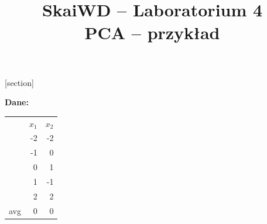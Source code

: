 \documentclass[a4paper,11pt]{article}
\newcommand{\myHeaderCellColor}{\cellcolor{black!10}}
\newcommand{\myEmptySpace}{\hspace{0.8cm}}
\begin{document}
\title{{\large SkaiWD -- Laboratorium 4}\\\textbf{PCA -- przykład}}
\date{}
\maketitle
\vspace{-1cm}

\def \myZadanieOdstep {1cm}
[section]
\newcommand{\theMyTaskNumber}{\stepcounter{myTaskNumber}\arabic{myTaskNumber}}
\newcommand{\theMySectNumber}{\arabic{section}}


\noindent\begin{minipage}[t]{0.3\textwidth}
\noindent\textbf{Dane:}\medskip\\
\begin{tabular}{l|r|r|}
\hhline{|~|-|-|}
& $x_1$\myHeaderCellColor & $x_2$\myHeaderCellColor\\\cline{2-3}
&-2&-2\\\cline{2-3}
&-1&0\\\cline{2-3}
&0&1\\\cline{2-3}
&1&-1\\\cline{2-3}
&2&2\\\hline
\multicolumn{1}{|l|}{avg\myHeaderCellColor} &0 &0 \\\hline
\end{tabular}
\end{minipage}
%
\end{document}
